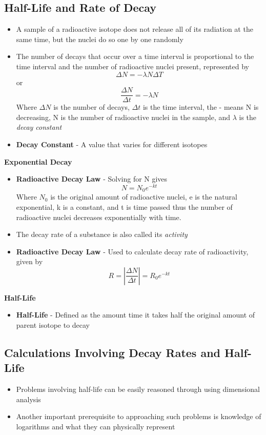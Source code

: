 \subsection{Half-Life and Rate of Decay}
\begin{itemize}
    \item A sample of a radioactive isotope does not release all of its radiation at the same time, but the nuclei do so one by one randomly
    \item The number of decays that occur over a time interval is proportional to the time interval and the number of radioactive nuclei present, represented by \[\Delta N=-\lambda N\Delta T\] or \[\frac{\Delta N}{\Delta t}=-\lambda N\] Where \(\Delta N\) is the number of decays, \(\Delta t\) is the time interval, the - means N is decreasing, N is the number of radioactive nuclei in the sample, and \(\lambda\) is the \emph{decay constant}
    \item \textbf{Decay Constant} - A value that varies for different isotopes
\end{itemize}

\textbf{Exponential Decay}
\begin{itemize}
    \item \textbf{Radioactive Decay Law} - Solving for N gives \[N=N_0e^{-kt}\] Where \(N_0\) is the original amount of radioactive nuclei, e is the natural exponential, k is a constant, and t is time passed thus the number of radioactive nuclei decreases exponentially with time.
    \item The decay rate of a substance is also called its \emph{activity}
    \item\textbf{Radioactive Decay Law} - Used to calculate decay rate of radioactivity, given by \[R=|\frac{\Delta N}{\Delta t}|=R_0e^{-kt}\]
\end{itemize}

\textbf{Half-Life}
\begin{itemize}
    \item \textbf{Half-Life} - Defined as the amount time it takes half the original amount of parent isotope to decay
\end{itemize}

\subsection{Calculations Involving Decay Rates and Half-Life}
\begin{itemize}
    \item Problems involving half-life can be easily reasoned through using dimensional analysis
    \item Another important prerequisite to approaching such problems is knowledge of logarithms and what they can physically represent
\end{itemize}

